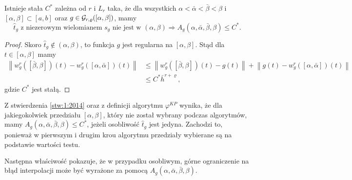 \documentclass[oik, pdftex, robocza, man]{mgrwms}
\begin{document}
    \begin{stw} \label{stw:1:2014}
        Istnieje stała $C^{*}$ zależna od $r$ i $L_{r}$ taka, że dla wszystkich $\alpha < \bar{\alpha} < \bar{\beta} < \beta$ i $[\alpha, \beta] \subset [a, b]$ oraz  $g \in \mathcal{G}_{r,\varrho}([\alpha,\beta])$, mamy
        \begin{equation*}
            \hat{t}_{g} \text{ z niezerowym wielomianem } s_{g} \text{ nie jest w } (\alpha, \beta) \Longrightarrow A_{g}(\alpha, \bar{\alpha}, \bar{\beta}, \beta) \leq C^{*}.
        \end{equation*}
    \end{stw}
    \begin{proof}
        Skoro $\hat{t}_{g} \notin (\alpha, \beta)$, to funkcja $g$ jest regularna na $[\alpha, \beta]$. Stąd dla $t \in[\alpha, \beta]$ mamy
        \begin{equation*}
            \begin{aligned}
                \left\|w_{g}^{r}([\bar{\beta}, \beta])(t)-w_{g}^{r}([\alpha, \bar{\alpha}])(t)\right\| & \leq\left\|w_{g}^{r}([\bar{\beta}, \beta])(t)-g(t)\right\|+\left\|g(t)-w_{g}^{r}([\alpha, \bar{\alpha}])(t)\right\| \\
                & \leq C^{*} \bar{h}^{r+\varrho},
            \end{aligned}
        \end{equation*}
    gdzie $C^{*}$ jest stałą.
    \end{proof}

    \begin{uw} \label{uw:1}
        Z stwierdzenia \ref{stw:1:2014} oraz z definicji algorytmu $\varphi^{KP}$ wynika, że dla jakiegokolwiek przedziału $[\alpha, \beta]$, który nie został wybrany podczas algorytmów, mamy $A_{g}(\alpha, \bar{\alpha}, \bar{\beta}, \beta) \leq C^{*}$, jeżeli osobliwość $\hat{t}_{g}$ jest jedyna. Zachodzi to, ponieważ w pierwszym i drugim krou algorytmu przedziały wybierane są na podstawie wartości testu.
    \end{uw}

    Następna właściwość pokazuje, że w przypadku osobliwym, górne ograniczenie na błąd interpolacji może być wyrażone za pomocą $A_{g}(\alpha, \bar{\alpha}, \bar{\beta}, \beta)$.
\end{document}
